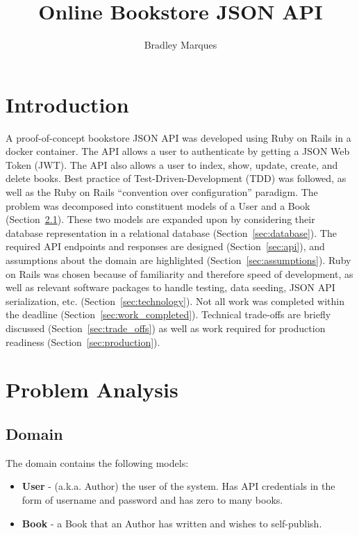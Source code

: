 \documentclass[a4paper]{article}
\title{Online Bookstore JSON API}
\author{Bradley Marques}
\begin{document}
\maketitle

\section{Introduction}

A proof-of-concept bookstore JSON API was developed using Ruby on Rails in a
docker container.
The API allows a user to authenticate by getting a JSON Web Token (JWT).
The API also allows a user to index, show, update, create, and delete books.
Best practice of Test-Driven-Development (TDD) was followed, as well as the
Ruby on Rails ``convention over configuration'' paradigm.
The problem was decomposed into constituent models of a User and a Book
(Section~\ref{sec:domain}).
These two models are expanded upon by considering their database representation
in a relational database (Section~\ref{sec:database}).
The required API endpoints and responses are designed (Section~\ref{sec:api}),
and assumptions about the domain are highlighted (Section~\ref{sec:assumptions}).
Ruby on Rails was chosen because of familiarity and therefore speed of
development, as well as relevant software packages to handle testing, data
seeding, JSON API serialization, etc. (Section~\ref{sec:technology}).
Not all work was completed within the deadline (Section~\ref{sec:work_completed}).
Technical trade-offs are briefly discussed (Section~\ref{sec:trade_offs}) as
well as work required for production readiness (Section~\ref{sec:production}).

\section{Problem Analysis}

\subsection{Domain}
\label{sec:domain}

The domain contains the following models:

\begin{itemize}
  \item \textbf{User} - (a.k.a. Author) the user of the system. Has API
  credentials in the form of username and password and has zero to many books.
  \item \textbf{Book} - a Book that an Author has written and wishes to
  self-publish.
\end{itemize}
\end{document}

